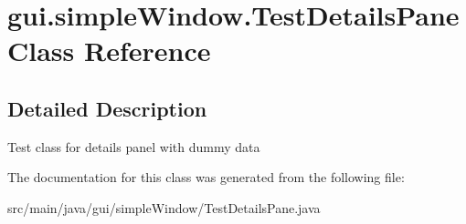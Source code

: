 \hypertarget{classgui_1_1simple_window_1_1_test_details_pane}{}\section{gui.\+simple\+Window.\+Test\+Details\+Pane Class Reference}
\label{classgui_1_1simple_window_1_1_test_details_pane}


\subsection{Detailed Description}
Test class for details panel with dummy data 

The documentation for this class was generated from the following file\+:\begin{DoxyCompactItemize}
\item 
src/main/java/gui/simple\+Window/Test\+Details\+Pane.\+java\end{DoxyCompactItemize}
